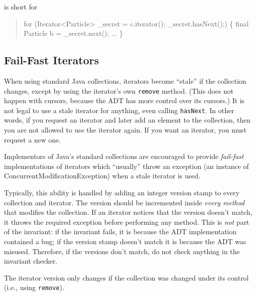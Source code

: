is short for
\begin{quote}
\begin{htmlonly}
\begin{alltt}
\end{htmlonly}
%begin{latexonly}
\begin{program}
%end{latexonly}
for (Iterator<Particle> _secret = $c$.iterator(); _secret.hasNext();) \{
   final Particle b = _secret.next();
   ...
\}
%begin{latexonly}
\end{program}
%end{latexonly}
\begin{htmlonly}
\end{alltt}
\end{htmlonly}
\end{quote}

\subsection{Fail-Fast Iterators}

When using standard Java collections,
iterators become ``stale'' if the collection changes, except by using
the iterator's own \verb|remove| method.  (This does not happen with
cursors, because the ADT has more control over its cursors.)
It is not legal to
use a stale iterator for anything, even calling \verb|hasNext|.
In other words, if you request an iterator and later add an element to
the collection, then you are not allowed to use the iterator again.
If you want an iterator, you must request a new one.

Implementors of Java's standard 
collections are encouraged to provide \emph{fail-fast}
implementations of iterators which ``usually'' throw an exception
(an instance of \textsf{ConcurrentModificationException})
when a stale iterator is used.

Typically, this ability is handled by adding an integer version stamp to every
collection and iterator.  The version should be incremented inside \emph{every method} that
modifies the collection.  If an iterator notices that the version doesn't
match, it throws the required exception before performing any method.
This is \emph{not} part of the invariant: if the invariant fails, it
is because the ADT implementation contained a bug; if the version stamp doesn't match it
is because the ADT was misused. Therefore, if the versions don't
match, do not check anything in the invariant checker.

The iterator version only changes if the collection was changed under
its control (i.e., using \verb|remove|).

